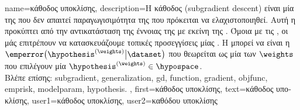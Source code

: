 {name={\foreignlanguage{greek}{κάθοδος υποκλίσης}}, 
	description={\foreignlanguage{greek}{Η κάθοδος}  
		(subgradient descent) \foreignlanguage{greek}{είναι μία}  \foreignlanguage{greek}{της}  
		\foreignlanguage{greek}{που δεν απαιτεί παραγωγισιμότητα της}  \foreignlanguage{greek}{που πρόκειται να 
		ελαχιστοποιηθεί. Αυτή η}  \foreignlanguage{greek}{προκύπτει από την αντικατάσταση της έννοιας της} 
		 \foreignlanguage{greek}{με εκείνη της} . \foreignlanguage{greek}{Όμοια με τις} 
		, \foreignlanguage{greek}{οι}  \foreignlanguage{greek}{μάς επιτρέπουν να κατασκευάζουμε 
		τοπικές προσεγγίσεις μίας} . \foreignlanguage{greek}{Η}  \foreignlanguage{greek}{μπορεί να είναι η}
		 $\emperror\big( \hypothesis^{(\weights)} \big| \dataset \big)$ \foreignlanguage{greek}{που θεωρείται ως μία} 
		 \foreignlanguage{greek}{των}  $\weights$ \foreignlanguage{greek}{που επιλέγουν μία} 
		 $\hypothesis^{(\weights)} \in \hypospace$.
				\\
		\foreignlanguage{greek}{Βλέπε επίσης:} \gls{subgradient}, \gls{generalization}, \gls{gd}, \gls{function}, \gls{gradient}, \gls{objfunc}, \gls{emprisk}, 
		\gls{modelparam}, \gls{hypothesis}. },
	first={\foreignlanguage{greek}{κάθοδος υποκλίσης}},
	text={\foreignlanguage{greek}{κάθοδος υποκλίσης}},
	user1={\foreignlanguage{greek}{κάθοδος υποκλίσης}}, %
	user2={\foreignlanguage{greek}{καθόδου υποκλίσης}} %
}%

